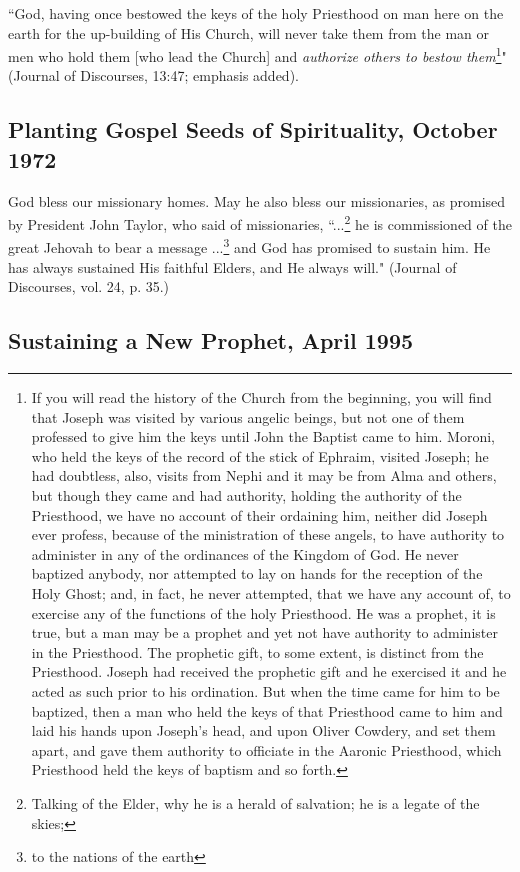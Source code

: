 ``God, having once bestowed the keys of the holy Priesthood on man here on the earth for the up-building of His Church, will never take them from the man or men who hold them [who lead the Church] and \textit{authorize others to bestow them}\footnote{If you will read the history of the Church from the beginning, you will find that Joseph was visited by various angelic beings, but not one of them professed to give him the keys until John the Baptist came to him. Moroni, who held the keys of the record of the stick of Ephraim, visited Joseph; he had doubtless, also, visits from Nephi and it may be from Alma and others, but though they came and had authority, holding the authority of the Priesthood, we have no account of their ordaining him, neither did Joseph ever profess, because of the ministration of these angels, to have authority to administer in any of the ordinances of the Kingdom of God. He never baptized anybody, nor attempted to lay on hands for the reception of the Holy Ghost; and, in fact, he never attempted, that we have any account of, to exercise any of the functions of the holy Priesthood. He was a prophet, it is true, but a man may be a prophet and yet not have authority to administer in the Priesthood. The prophetic gift, to some extent, is distinct from the Priesthood. Joseph had received the prophetic gift and he exercised it and he acted as such prior to his ordination. But when the time came for him to be baptized, then a man who held the keys of that Priesthood came to him and laid his hands upon Joseph's head, and upon Oliver Cowdery, and set them apart, and gave them authority to officiate in the Aaronic Priesthood, which Priesthood held the keys of baptism and so forth.}" (Journal of Discourses, 13:47; emphasis added).

\subsection{Planting Gospel Seeds of Spirituality, October 1972}

God bless our missionary homes. May he also bless our missionaries, as promised by President John Taylor, who said of missionaries, ``...\footnote{Talking of the Elder, why he is a herald of salvation; he is a legate of the skies;} he is commissioned of the great Jehovah to bear a message ...\footnote{to the nations of the earth} and God has promised to sustain him. He has always sustained His faithful Elders, and He always will." (Journal of Discourses, vol. 24, p. 35.)

\subsection{Sustaining a New Prophet, April 1995}

